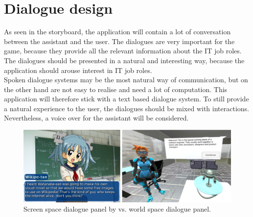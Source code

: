 \section{Dialogue design}
As seen in the storyboard, the application will contain a lot of conversation between the assistant and the user. The dialogues are very important for the game, because they provide all the relevant information about the IT job roles. The dialogues should be presented in a natural and interesting way, because the application should arouse interest in IT job roles.\\
Spoken dialogue systems may be the most natural way of communication, but on the other hand are not easy to realise and need a lot of computation. This application will therefore stick with a text based dialogue system. To still provide a natural experience to the user, the dialogues should be mixed with interactions. Nevertheless, a voice over for the assistant will be considered. \\
\begin{figure}[h!]
  \includegraphics[width=16cm]{kapitel/screen-vs-world-dialog.png}
  \centering
  \caption{Screen space dialogue panel by \cite{screenspace} vs. world space dialogue panel.}
  \label{fig:screen-world-dialogs}
\end{figure}
